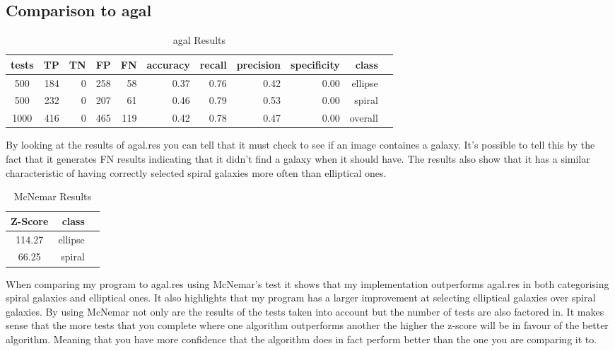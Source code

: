 \documentclass{article}
\begin{document}
\subsection{Comparison to agal}
\begin{table}[h]
\caption{agal Results}
\centering
\begin{tabular}{c rrrrrrrrrr}
\hline \hline
tests & TP & TN & FP & FN & accuracy & recall & precision & specificity & class \\[0.5ex]
\hline
500 & 184 & 0 & 258 & 58 & 0.37 & 0.76 & 0.42 & 0.00 & ellipse \\
500 & 232 & 0 & 207 & 61 & 0.46 & 0.79 & 0.53 & 0.00 & spiral \\
1000 & 416 & 0 & 465 & 119 & 0.42 & 0.78 & 0.47 & 0.00 & overall \\
\hline
\end{tabular}
\end{table}
By looking at the results of agal.res you can tell that it must check to see if an image containes a galaxy. It's possible to tell this by the fact that it generates FN results indicating that it didn't find a galaxy when it should have. The results also show that it has a similar characteristic of having correctly selected spiral galaxies more often than elliptical ones.

\begin{table}[h]
\caption{McNemar Results}
\centering
\begin{tabular}{c rr}
\hline \hline
Z-Score & class \\[0.5ex]
\hline
114.27 & ellipse \\
66.25 & spiral \\
\hline
\end{tabular}
\end{table}

When comparing my program to agal.res using McNemar's test it shows that my implementation outperforms agal.res in both categorising spiral galaxies and elliptical ones. It also highlights that my program has a larger improvement at selecting elliptical galaxies over spiral galaxies. By using McNemar not only are the results of the tests taken into account but the number of tests are also factored in. It makes sense that the more tests that you complete where one algorithm outperforms another the higher the z-score will be in favour of the better algorithm. Meaning that you have more confidence that the algorithm does in fact perform better than the one you are comparing it to.
\end{document}
